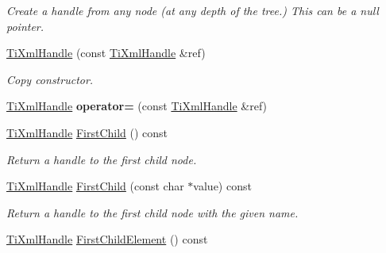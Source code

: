 \begin{DoxyCompactItemize}
\begin{DoxyCompactList}\small\item\em Create a handle from any node (at any depth of the tree.) This can be a null pointer. \end{DoxyCompactList}\item 
\hypertarget{class_ti_xml_handle_a236d7855e1e56ccc7b980630c48c7fd7}{\hyperlink{class_ti_xml_handle_a236d7855e1e56ccc7b980630c48c7fd7}{Ti\+Xml\+Handle} (const \hyperlink{class_ti_xml_handle}{Ti\+Xml\+Handle} \&ref)}\label{class_ti_xml_handle_a236d7855e1e56ccc7b980630c48c7fd7}

\begin{DoxyCompactList}\small\item\em Copy constructor. \end{DoxyCompactList}\item 
\hypertarget{class_ti_xml_handle_ad8e5dcf6a87882674203157f29f8e4db}{\hyperlink{class_ti_xml_handle}{Ti\+Xml\+Handle} {\bfseries operator=} (const \hyperlink{class_ti_xml_handle}{Ti\+Xml\+Handle} \&ref)}\label{class_ti_xml_handle_ad8e5dcf6a87882674203157f29f8e4db}

\item 
\hypertarget{class_ti_xml_handle_acdb1faaf88a700b40ca2c8d9aee21139}{\hyperlink{class_ti_xml_handle}{Ti\+Xml\+Handle} \hyperlink{class_ti_xml_handle_acdb1faaf88a700b40ca2c8d9aee21139}{First\+Child} () const }\label{class_ti_xml_handle_acdb1faaf88a700b40ca2c8d9aee21139}

\begin{DoxyCompactList}\small\item\em Return a handle to the first child node. \end{DoxyCompactList}\item 
\hypertarget{class_ti_xml_handle_a8c61f64ae9365d89c264f289085541f8}{\hyperlink{class_ti_xml_handle}{Ti\+Xml\+Handle} \hyperlink{class_ti_xml_handle_a8c61f64ae9365d89c264f289085541f8}{First\+Child} (const char $\ast$value) const }\label{class_ti_xml_handle_a8c61f64ae9365d89c264f289085541f8}

\begin{DoxyCompactList}\small\item\em Return a handle to the first child node with the given name. \end{DoxyCompactList}\item 
\hypertarget{class_ti_xml_handle_a24d1112e995e937e4dddb202d4113d4a}{\hyperlink{class_ti_xml_handle}{Ti\+Xml\+Handle} \hyperlink{class_ti_xml_handle_a24d1112e995e937e4dddb202d4113d4a}{First\+Child\+Element} () const }\label{class_ti_xml_handle_a24d1112e995e937e4dddb202d4113d4a}


\end{DoxyCompactItemize}
